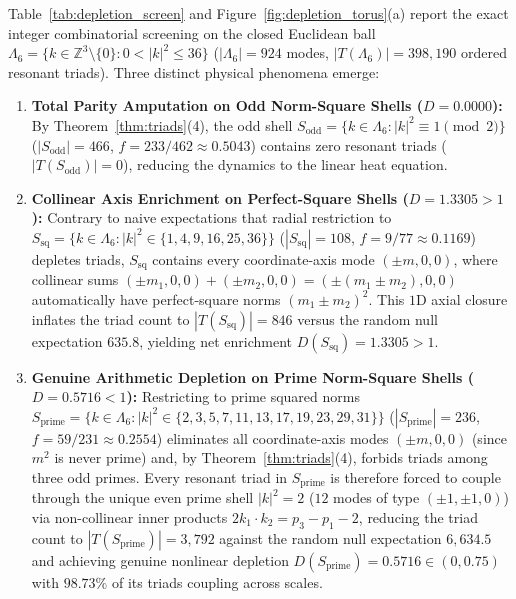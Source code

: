 \documentclass[11pt,a4paper]{article}
\theoremstyle{definition}
\theoremstyle{remark}
\begin{document}
Table~\ref{tab:depletion_screen} and Figure~\ref{fig:depletion_torus}(a) report the exact integer combinatorial screening on the closed Euclidean ball $\Lambda_6 = \{k \in \mathbb{Z}^3 \setminus \{0\} : 0 < |k|^2 \le 36\}$ ($|\Lambda_6| = 924$ modes, $|T(\Lambda_6)| = 398{,}190$ ordered resonant triads). Three distinct physical phenomena emerge:
\begin{enumerate}
\item \textbf{Total Parity Amputation on Odd Norm-Square Shells ($D = 0.0000$):} By Theorem~\ref{thm:triads}(4), the odd shell $S_{\mathrm{odd}} = \{k \in \Lambda_6 : |k|^2 \equiv 1 \pmod 2\}$ ($|S_{\mathrm{odd}}| = 466$, $f = 233/462 \approx 0.5043$) contains zero resonant triads ($|T(S_{\mathrm{odd}})| = 0$), reducing the dynamics to the linear heat equation.
\item \textbf{Collinear Axis Enrichment on Perfect-Square Shells ($D = 1.3305 > 1$):} Contrary to naive expectations that radial restriction to $S_{\mathrm{sq}} = \{k \in \Lambda_6 : |k|^2 \in \{1, 4, 9, 16, 25, 36\}\}$ ($|S_{\mathrm{sq}}| = 108$, $f = 9/77 \approx 0.1169$) depletes triads, $S_{\mathrm{sq}}$ contains every coordinate-axis mode $(\pm m, 0, 0)$, where collinear sums $(\pm m_1, 0, 0) + (\pm m_2, 0, 0) = (\pm(m_1 \pm m_2), 0, 0)$ automatically have perfect-square norms $(m_1 \pm m_2)^2$. This $1$D axial closure inflates the triad count to $|T(S_{\mathrm{sq}})| = 846$ versus the random null expectation $635.8$, yielding net enrichment $D(S_{\mathrm{sq}}) = 1.3305 > 1$.
\item \textbf{Genuine Arithmetic Depletion on Prime Norm-Square Shells ($D = 0.5716 < 1$):} Restricting to prime squared norms $S_{\mathrm{prime}} = \{k \in \Lambda_6 : |k|^2 \in \{2,3,5,7,11,13,17,19,23,29,31\}\}$ ($|S_{\mathrm{prime}}| = 236$, $f = 59/231 \approx 0.2554$) eliminates all coordinate-axis modes $(\pm m, 0, 0)$ (since $m^2$ is never prime) and, by Theorem~\ref{thm:triads}(4), forbids triads among three odd primes. Every resonant triad in $S_{\mathrm{prime}}$ is therefore forced to couple through the unique even prime shell $|k|^2 = 2$ ($12$ modes of type $(\pm 1, \pm 1, 0)$) via non-collinear inner products $2 k_1 \cdot k_2 = p_3 - p_1 - 2$, reducing the triad count to $|T(S_{\mathrm{prime}})| = 3{,}792$ against the random null expectation $6{,}634.5$ and achieving genuine nonlinear depletion $D(S_{\mathrm{prime}}) = 0.5716 \in (0, 0.75)$ with $98.73\%$ of its triads coupling across scales.
\end{enumerate}
\end{document}
